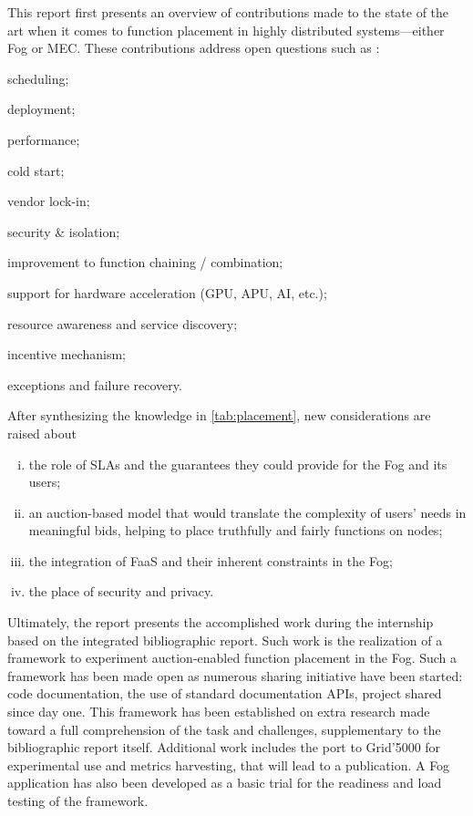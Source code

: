 This report first presents an overview of contributions made to the state of the art when it comes to function placement in highly distributed systems—either Fog or \gls{MEC}. These contributions address open questions such as \cite{kjorveziroski_iot_2021,xie_when_2021}:
\begin{enumerate*}[(a)]
	\item scheduling;
	\item deployment;
	\item performance;
	\item cold start;
	\item vendor lock-in;
	\item security \& isolation;
	\item improvement to function chaining / combination;
	\item support for hardware acceleration (\gls{GPU}, \gls{APU}, \gls{AI}, etc.);
	\item resource awareness and service discovery;
	\item incentive mechanism;
	\item exceptions and failure recovery.
\end{enumerate*}
After synthesizing the knowledge in \cref{tab:placement}, new considerations are raised about
\begin{enumerate}[(i)]
	\item the role of \glspl{SLA} and the guarantees they could provide for the Fog and its users;
	\item an auction-based model that would translate the complexity of users' needs in meaningful bids, helping to place truthfully and fairly functions on nodes;
	\item the integration of \gls{FaaS} and their inherent constraints in the Fog;
	\item the place of security and privacy.
\end{enumerate}
Ultimately, the report presents the accomplished work during the internship based on the integrated bibliographic report. Such work is the realization of a framework to experiment auction-enabled function placement in the Fog. Such a framework has been made open as numerous sharing initiative have been started: code documentation, the use of standard documentation \glspl{API}, project shared since day one. This framework has been established on extra research made toward a full comprehension of the task and challenges, supplementary to the bibliographic report itself. Additional work includes the port to Grid'5000 for experimental use and metrics harvesting, that will lead to a publication. A Fog application has also been developed as a basic trial for the readiness and load testing of the framework.